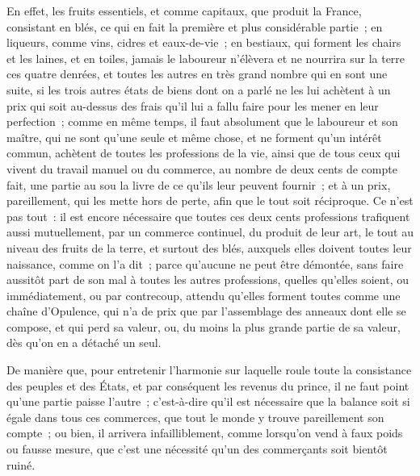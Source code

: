 \documentclass[french,twoside]{book} %
\begin{document}
En effet, les fruits essentiels, et comme capitaux, que produit la France, consistant en blés, ce qui en fait la première et plus considérable partie ; en liqueurs, comme vins, cidres et eaux-de-vie ; en bestiaux, qui forment les chairs et les laines, et en toiles, jamais le laboureur n’élèvera et ne nourrira sur la terre ces quatre denrées, et toutes les autres en très grand nombre qui en sont une suite, si les trois autres états de biens dont on a parlé ne les lui achètent à un prix qui soit au-dessus des frais qu’il lui a fallu faire pour les mener en leur perfection ; comme en même temps, il faut absolument que le laboureur et son maître, qui ne sont qu’une seule et même chose, et ne forment qu’un intérêt commun, achètent de toutes les professions de la vie, ainsi que de tous ceux qui vivent du travail manuel ou du commerce, au nombre de deux cents de compte fait, une partie au sou la livre de ce qu’ils leur peuvent fournir ; et à un prix, pareillement, qui les mette hors de perte, afin que le tout soit réciproque. Ce n’est pas tout : il est encore nécessaire que toutes ces deux cents professions trafiquent aussi mutuellement, par un commerce continuel, du produit de leur art, le tout au niveau des fruits de la terre, et surtout des blés, auxquels elles doivent toutes leur naissance, comme on l’a dit ; parce qu’aucune ne peut être démontée, sans faire aussitôt part de son mal à toutes les autres professions, quelles qu’elles soient, ou immédiatement, ou par contrecoup, attendu qu’elles forment toutes comme une chaîne d’Opulence, qui n’a de prix que par l’assemblage des anneaux dont elle se compose, et qui perd sa valeur, ou, du moins la plus grande partie de sa valeur, dès qu’on en a détaché un seul.\par
De manière que, pour entretenir l’harmonie sur laquelle roule toute la consistance des peuples et des États, et par conséquent les revenus du prince, il ne faut point qu’une partie paisse l’autre ; c’est-à-dire qu’il est nécessaire que la balance soit si égale dans tous ces commerces, que tout le monde y trouve pareillement son compte ; ou bien, il arrivera infailliblement, comme lorsqu’on vend à faux poids ou fausse mesure, que c’est une nécessité qu’un des commerçants soit bientôt ruiné.\par
\end{document}
